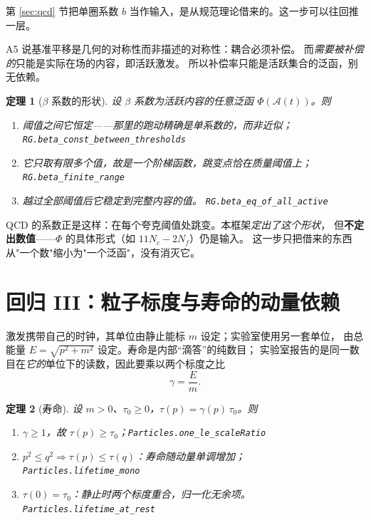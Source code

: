 \documentclass[11pt,a4paper]{article}
\theoremstyle{sudef}
\newtheorem{theorem}{定理}[section]
\newcommand{\lean}[1]{\hfill{\small\color{lncol}\texttt{#1}}}
\begin{document}
第 \ref{sec:qcd} 节把单圈系数 $b$ 当作输入，是从规范理论借来的。这一步可以往回推一层。

A5 说基准平移是几何的对称性而非描述的对称性：耦合必须补偿。
而\emph{需要被补偿的}只能是实际在场的内容，即活跃激发。
所以补偿率只能是活跃集合的泛函，别无依赖。

\begin{theorem}[$\beta$ 系数的形状]\label{thm:beta}
设 $\beta$ 系数为活跃内容的任意泛函 $\Phi(\mathcal{A}(t))$。则
\begin{enumerate}[label=(\roman*),leftmargin=2em]
\item 阈值之间它\emph{恒定}——那里的跑动精确是单系数的，而非近似；
      \lean{RG.beta\_const\_between\_thresholds}
\item 它只取有限多个值，故是一个阶梯函数，跳变点恰在质量阈值上；
      \lean{RG.beta\_finite\_range}
\item 越过全部阈值后它稳定到完整内容的值。
      \lean{RG.beta\_eq\_of\_all\_active}
\end{enumerate}
\end{theorem}

QCD 的系数正是这样：在每个夸克阈值处跳变。本框架\emph{定出了这个形状}，
但\textbf{不定出数值}——$\Phi$ 的具体形式（如 $11N_c-2N_f$）仍是输入。
这一步只把借来的东西从"一个数"缩小为"一个泛函"，没有消灭它。

\section{回归 III：粒子标度与寿命的动量依赖}\label{sec:particles}

激发携带自己的时钟，其单位由静止能标 $m$ 设定；实验室使用另一套单位，
由总能量 $E=\sqrt{p^2+m^2}$ 设定。寿命是内部“滴答”的纯数目；
实验室报告的是同一数目在\emph{它的}单位下的读数，因此要乘以两个标度之比
\[
\gamma = \frac{E}{m}.
\]

\begin{theorem}[寿命]\label{thm:lifetime}
设 $m>0$、$\tau_0\ge 0$，$\tau(p)=\gamma(p)\,\tau_0$。则
\begin{enumerate}[label=(\roman*),leftmargin=2em]
\item $\gamma\ge 1$，故 $\tau(p)\ge\tau_0$；\lean{Particles.one\_le\_scaleRatio}
\item $p^2\le q^2 \Rightarrow \tau(p)\le\tau(q)$：寿命随动量单调增加；
      \lean{Particles.lifetime\_mono}
\item $\tau(0)=\tau_0$：静止时两个标度重合，归一化无余项。
      \lean{Particles.lifetime\_at\_rest}
\end{enumerate}
\end{theorem}
\end{document}
